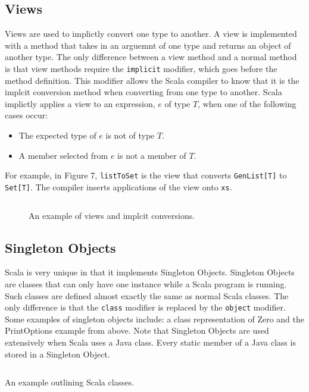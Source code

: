 \documentclass[jou,apacite]{IEEEtran}
\begin{document}
\subsection{Views}
\label{sec:views}
Views are used to implictly convert one type to another. A view is implemented
with a method that takes in an arguemnt of one type and returns an object of
another type. The only difference between a view method and a normal method is
that view methods require the \texttt{implicit} modifier, which goes before the
method definition. This modifier allows the Scala compiler to know that it is
the implcit conversion method when converting from one type to another. Scala
implictly applies a view to an expression, $e$ of type $T$, when one of the
following cases occur:
\begin{itemize}
\item The expected type of $e$ is not of type $T$.
\item A member selected from $e$ is not a member of $T$.
\end{itemize}  
For example, in Figure 7, \texttt{listToSet} is the view that converts \texttt{GenList[T]} to \texttt{Set[T]}. The compiler inserts applications of the view onto \texttt{xs}.

\begin{figure}
  \inputminted{Scala}{../examples/Set.scala}
  \caption{An example of views and implcit conversions.}
  \label{lst:nats-example}
\end{figure}

\subsection{Singleton Objects}
\label{sec:singleton-objects}

Scala is very unique in that it implements Singleton Objects. Singleton Objects
are classes that can only have one instance while a Scala program is
running. Such classes are defined almost exactly the same as normal Scala
classes. The only difference is that the \texttt{class} modifier is replaced by
the \texttt{object} modifier. Some examples of singleton objects include: a
class representation of Zero and the PrintOptions example from above. Note that
Singleton Objects are used extensively when Scala uses a Java class. Every
static member of a Java class is stored in a Singleton Object.

\begin{listing}
  \inputminted[frame=single]{Scala}{../examples/Nat.scala}
  \caption{An example outlining Scala classes.}
  \label{lst:nats-example}
\end{listing}
\end{document}
